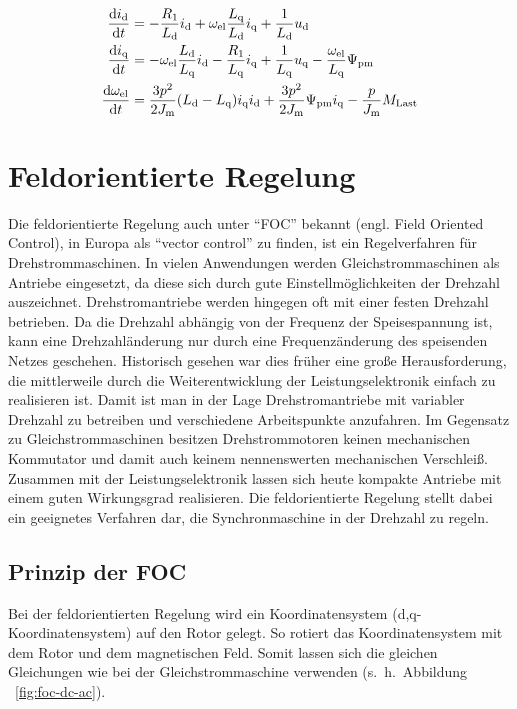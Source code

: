\begin{align}
\frac{\mathrm{d}i_{\mathrm{d}}}{\mathrm{d}t} &= -\frac{R_{\mathrm{1}}}{L_{\mathrm{d}}}i_{\mathrm{d}}+\omega_{\mathrm{el}}\frac{L_{\mathrm{q}}}{L_{\mathrm{d}}}i_{\mathrm{q}}+\frac{1}{L_{\mathrm{d}}}u_{\mathrm{d}} \label{eqn:id_dt} \\
\frac{\mathrm{d}i_{\mathrm{q}}}{\mathrm{d}t} &= -\omega_{\mathrm{el}}\frac{L_{\mathrm{d}}}{L_{\mathrm{q}}}i_{\mathrm{d}} - \frac{R_{\mathrm{1}}}{L_{\mathrm{q}}}i_{\mathrm{q}} + \frac{1}{L_{\mathrm{q}}}u_{\mathrm{q}} - \frac{\omega_{\mathrm{el}}}{L_{\mathrm{q}}}\Psi_{\mathrm{pm}} \label{eqn:iq_dt} \\
\frac{\mathrm{d}\omega_{\mathrm{el}}}{\mathrm{d}t} &= \frac{3p^2}{2J_{\mathrm{m}}}(L_{\mathrm{d}} - L_{\mathrm{q}})i_{\mathrm{q}} i_{\mathrm{d}} + \frac{3p^2}{2J_{\mathrm{m}}} \Psi_{\mathrm{pm}} i_{\mathrm{q}} - \frac{p}{J_{\mathrm{m}}} M_{\mathrm{Last}} \label{eqn:dw_dt}
\end{align}

\section{Feldorientierte Regelung}\label{sec:foc}

Die feldorientierte Regelung auch unter \enquote{FOC} bekannt (engl. Field Oriented Control), in Europa als \enquote{vector control} zu finden, ist ein Regelverfahren für Drehstrommaschinen.
In vielen Anwendungen werden Gleichstrommaschinen als Antriebe eingesetzt, da diese sich durch gute Einstellmöglichkeiten der Drehzahl auszeichnet.
Drehstromantriebe werden hingegen oft mit einer festen Drehzahl betrieben.
Da die Drehzahl abhängig von der Frequenz der Speisespannung ist, kann eine Drehzahländerung nur durch eine Frequenzänderung des speisenden Netzes geschehen.
Historisch gesehen war dies früher eine große Herausforderung, die mittlerweile durch die Weiterentwicklung der Leistungselektronik einfach zu realisieren ist.
Damit ist man in der Lage Drehstromantriebe mit variabler Drehzahl zu betreiben und verschiedene Arbeitspunkte anzufahren.
Im Gegensatz zu Gleichstrommaschinen besitzen Drehstrommotoren keinen mechanischen Kommutator und damit auch keinem nennenswerten mechanischen Verschleiß.
Zusammen mit der Leistungselektronik lassen sich heute kompakte Antriebe mit einem guten Wirkungsgrad realisieren.
Die feldorientierte Regelung stellt dabei ein geeignetes Verfahren dar, die Synchronmaschine in der Drehzahl zu regeln.

\subsection{Prinzip der FOC}

Bei der feldorientierten Regelung wird ein Koordinatensystem (d,q-Koordinatensystem) auf den Rotor gelegt. So rotiert das Koordinatensystem mit dem Rotor und dem magnetischen Feld.
Somit lassen sich die gleichen Gleichungen wie bei der Gleichstrommaschine verwenden (s.~h.~Abbildung ~\ref{fig:foc-dc-ac}).

